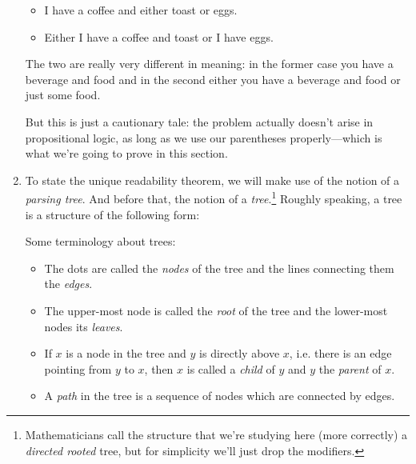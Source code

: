 \begin{enumerate}[\thesection.1]
\begin{itemize}
		\item I have a coffee and either toast or eggs.
		
		\item Either I have a coffee and toast or I have eggs.
	
	\end{itemize}
The two are really very different in meaning: in the former case you have a beverage and food and in the second either you have a beverage and food or just some food.

But this is just a cautionary tale: the problem actually doesn't arise in propositional logic, as long as we use our parentheses properly---which is what we're going to prove in this section.

	\item To state the unique readability theorem, we will make use of the notion of a \emph{parsing tree}. And before that, the notion of a \emph{tree}.\footnote{Mathematicians call the structure that we're studying here (more correctly) a \emph{directed rooted} tree, but for simplicity we'll just drop the modifiers.} Roughly speaking, a tree is a structure of the following form:

\begin{center}
\end{center}

Some terminology about trees: 
	\begin{itemize}
		
		\item The dots are called the {\it nodes} of the tree and the lines connecting them the {\it edges}. 
		
		\item The upper-most node is called the {\it root} of the tree and the lower-most nodes its {\it leaves}. 
		
		\item If $x$ is a node in the tree and $y$ is directly above $x$, i.e. there is an edge pointing from $y$ to $x$, then $x$ is called a {\it child} of $y$ and $y$ the \emph{parent} of $x$. 
		
		\item A {\it path} in the tree is a sequence of nodes which are connected by edges. 
		

\end{itemize}
\end{enumerate}
